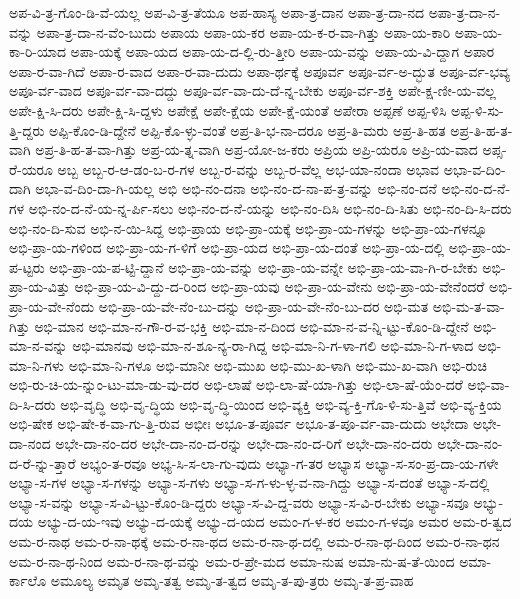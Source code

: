 {ಅಪ-ವಿ-ತ್ರ-ಗೊಂ-ಡಿ-ವೆ-ಯಲ್ಲ
ಅಪ-ವಿ-ತ್ರ-ತೆಯೂ
ಅಪ-ಹಾಸ್ಯ
ಅಪಾ-ತ್ರ-ದಾನ
ಅಪಾ-ತ್ರ-ದಾ-ನದ
ಅಪಾ-ತ್ರ-ದಾ-ನ-ವನ್ನು
ಅಪಾ-ತ್ರ-ದಾ-ನ-ವೆಂ-ಬುದು
ಅಪಾಯ
ಅಪಾ-ಯ-ಕರ
ಅಪಾ-ಯ-ಕ-ರ-ವಾ-ಗಿತ್ತು
ಅಪಾ-ಯ-ಕಾರಿ
ಅಪಾ-ಯ-ಕಾ-ರಿ-ಯಾದ
ಅಪಾ-ಯಕ್ಕೆ
ಅಪಾ-ಯದ
ಅಪಾ-ಯ-ದ-ಲ್ಲಿ-ರು-ತ್ತೀರಿ
ಅಪಾ-ಯ-ವನ್ನು
ಅಪಾ-ಯ-ವಿ-ದ್ದಾಗ
ಅಪಾರ
ಅಪಾ-ರ-ವಾ-ಗಿದೆ
ಅಪಾ-ರ-ವಾದ
ಅಪಾ-ರ-ವಾ-ದುದು
ಅಪಾ-ರ್ಥಕ್ಕೆ
ಅಪೂರ್ವ
ಅಪೂ-ರ್ವ-ಅ-ದ್ಭುತ
ಅಪೂ-ರ್ವ-ಭವ್ಯ
ಅಪೂ-ರ್ವ-ವಾದ
ಅಪೂ-ರ್ವ-ವಾ-ದದ್ದು
ಅಪೂ-ರ್ವ-ವಾ-ದು-ದೆ-ನ್ನ-ಬೇಕು
ಅಪೂ-ರ್ವ-ಶಕ್ತಿ
ಅಪೇ-ಕ್ಷ-ಣೀ-ಯ-ವಲ್ಲ
ಅಪೇ-ಕ್ಷಿ-ಸಿ-ದರು
ಅಪೇ-ಕ್ಷಿ-ಸಿ-ದ್ದಳು
ಅಪೇಕ್ಷೆ
ಅಪೇ-ಕ್ಷೆಯ
ಅಪೇ-ಕ್ಷೆ-ಯಂತೆ
ಅಪೇರಾ
ಅಪ್ಪಣೆ
ಅಪ್ಪ-ಳಿಸಿ
ಅಪ್ಪ-ಳಿ-ಸು-ತ್ತಿ-ದ್ದರು
ಅಪ್ಪಿ-ಕೊಂ-ಡಿ-ದ್ದೇನೆ
ಅಪ್ಪಿ-ಕೊ-ಳ್ಳು-ವಂತೆ
ಅಪ್ರ-ತಿ-ಭ-ನಾ-ದರೂ
ಅಪ್ರ-ತಿ-ಮರು
ಅಪ್ರ-ತಿ-ಹತ
ಅಪ್ರ-ತಿ-ಹ-ತ-ವಾಗಿ
ಅಪ್ರ-ತಿ-ಹ-ತ-ವಾ-ಗಿತ್ತು
ಅಪ್ರ-ಯ-ತ್ನ-ವಾಗಿ
ಅಪ್ರ-ಯೋ-ಜ-ಕರು
ಅಪ್ರಿಯ
ಅಪ್ರಿ-ಯರೂ
ಅಪ್ರಿ-ಯ-ವಾದ
ಅಪ್ಸ-ರೆ-ಯರೂ
ಅಬ್ಬ
ಅಬ್ಬ-ರ-ಆ-ಡಂ-ಬ-ರ-ಗಳ
ಅಬ್ಬ-ರ-ವನ್ನು
ಅಬ್ಬ-ರ-ವೆಲ್ಲ
ಅಭ-ಯಾ-ನಂದಾ
ಅಭಾವ
ಅಭಾ-ವ-ದಿಂ-ದಾಗಿ
ಅಭಾ-ವ-ದಿಂ-ದಾ-ಗಿ-ಯಲ್ಲ
ಅಭಿ
ಅಭಿ-ನಂ-ದನಾ
ಅಭಿ-ನಂ-ದ-ನಾ-ಪ-ತ್ರ-ವನ್ನು
ಅಭಿ-ನಂ-ದನೆ
ಅಭಿ-ನಂ-ದ-ನೆ-ಗಳ
ಅಭಿ-ನಂ-ದ-ನೆ-ಯ-ನ್ನ-ರ್ಪಿ-ಸಲು
ಅಭಿ-ನಂ-ದ-ನೆ-ಯನ್ನು
ಅಭಿ-ನಂ-ದಿಸಿ
ಅಭಿ-ನಂ-ದಿ-ಸಿತು
ಅಭಿ-ನಂ-ದಿ-ಸಿ-ದರು
ಅಭಿ-ನಂ-ದಿ-ಸುವ
ಅಭಿ-ನ-ಯಿ-ಸಿದ್ದ
ಅಭಿ-ಪ್ರಾಯ
ಅಭಿ-ಪ್ರಾ-ಯಕ್ಕೆ
ಅಭಿ-ಪ್ರಾ-ಯ-ಗಳನ್ನು
ಅಭಿ-ಪ್ರಾ-ಯ-ಗಳನ್ನೂ
ಅಭಿ-ಪ್ರಾ-ಯ-ಗಳಿಂದ
ಅಭಿ-ಪ್ರಾ-ಯ-ಗ-ಳಿಗೆ
ಅಭಿ-ಪ್ರಾ-ಯದ
ಅಭಿ-ಪ್ರಾ-ಯ-ದಂತೆ
ಅಭಿ-ಪ್ರಾ-ಯ-ದಲ್ಲಿ
ಅಭಿ-ಪ್ರಾ-ಯ-ಪ-ಟ್ಟರು
ಅಭಿ-ಪ್ರಾ-ಯ-ಪ-ಟ್ಟಿ-ದ್ದಾನೆ
ಅಭಿ-ಪ್ರಾ-ಯ-ವನ್ನು
ಅಭಿ-ಪ್ರಾ-ಯ-ವನ್ನೇ
ಅಭಿ-ಪ್ರಾ-ಯ-ವಾ-ಗಿ-ರ-ಬೇಕು
ಅಭಿ-ಪ್ರಾ-ಯ-ವಿತ್ತು
ಅಭಿ-ಪ್ರಾ-ಯ-ವಿ-ದ್ದು-ದ-ರಿಂದ
ಅಭಿ-ಪ್ರಾ-ಯವು
ಅಭಿ-ಪ್ರಾ-ಯ-ವೇನು
ಅಭಿ-ಪ್ರಾ-ಯ-ವೇನೆಂದರೆ
ಅಭಿ-ಪ್ರಾ-ಯ-ವೇ-ನೆಂದು
ಅಭಿ-ಪ್ರಾ-ಯ-ವೇ-ನೆಂ-ಬು-ದನ್ನು
ಅಭಿ-ಪ್ರಾ-ಯ-ವೇ-ನೆಂ-ಬು-ದರ
ಅಭಿ-ಮತ
ಅಭಿ-ಮ-ತ-ವಾ-ಗಿತ್ತು
ಅಭಿ-ಮಾನ
ಅಭಿ-ಮಾ-ನ-ಗೌ-ರ-ವ-ಭಕ್ತಿ
ಅಭಿ-ಮಾ-ನ-ದಿಂದ
ಅಭಿ-ಮಾ-ನ-ವ-ನ್ನಿ-ಟ್ಟು-ಕೊಂ-ಡಿ-ದ್ದೇನೆ
ಅಭಿ-ಮಾ-ನ-ವನ್ನು
ಅಭಿ-ಮಾನವು
ಅಭಿ-ಮಾ-ನ-ಶೂ-ನ್ಯ-ರಾ-ಗಿದ್ದ
ಅಭಿ-ಮಾ-ನಿ-ಗ-ಳಾ-ಗಲಿ
ಅಭಿ-ಮಾ-ನಿ-ಗ-ಳಾದ
ಅಭಿ-ಮಾ-ನಿ-ಗಳು
ಅಭಿ-ಮಾ-ನಿ-ಗಳೂ
ಅಭಿ-ಮಾನೀ
ಅಭಿ-ಮುಖ
ಅಭಿ-ಮು-ಖ-ಳಾಗಿ
ಅಭಿ-ಮು-ಖ-ವಾಗಿ
ಅಭಿ-ರುಚಿ
ಅಭಿ-ರು-ಚಿ-ಯ-ನ್ನುಂ-ಟು-ಮಾ-ಡು-ವು-ದರ
ಅಭಿ-ಲಾಷೆ
ಅಭಿ-ಲಾ-ಷೆ-ಯಾ-ಗಿತ್ತು
ಅಭಿ-ಲಾ-ಷೆ-ಯೆಂ-ದರೆ
ಅಭಿ-ವಾ-ದಿ-ಸಿ-ದರು
ಅಭಿ-ವೃದ್ಧಿ
ಅಭಿ-ವೃ-ದ್ಧಿಯ
ಅಭಿ-ವೃ-ದ್ಧಿ-ಯಿಂದ
ಅಭಿ-ವ್ಯಕ್ತಿ
ಅಭಿ-ವ್ಯ-ಕ್ತಿ-ಗೊ-ಳಿ-ಸು-ತ್ತಿವೆ
ಅಭಿ-ವ್ಯ-ಕ್ತಿಯ
ಅಭಿ-ಷೇಕ
ಅಭಿ-ಷೇ-ಕ-ವಾ-ಗು-ತ್ತಿ-ರುವ
ಅಭೀಃ
ಅಭೂ-ತ-ಪೂರ್ವ
ಅಭೂ-ತ-ಪೂ-ರ್ವ-ವಾ-ದುದು
ಅಭೇದಾ
ಅಭೇ-ದಾ-ನಂದ
ಅಭೇ-ದಾ-ನಂ-ದರ
ಅಭೇ-ದಾ-ನಂ-ದ-ರನ್ನು
ಅಭೇ-ದಾ-ನಂ-ದ-ರಿಗೆ
ಅಭೇ-ದಾ-ನಂ-ದರು
ಅಭೇ-ದಾ-ನಂ-ದ-ರೆ-ನ್ನು-ತ್ತಾರೆ
ಅಭ್ಯಂ-ತ-ರವೂ
ಅಭ್ಯ-ಸಿ-ಸ-ಲಾ-ಗು-ವುದು
ಅಭ್ಯಾ-ಗ-ತರ
ಅಭ್ಯಾಸ
ಅಭ್ಯಾ-ಸ-ಸಂ-ಪ್ರ-ದಾ-ಯ-ಗಳೇ
ಅಭ್ಯಾ-ಸ-ಗಳ
ಅಭ್ಯಾ-ಸ-ಗಳನ್ನು
ಅಭ್ಯಾ-ಸ-ಗಳು
ಅಭ್ಯಾ-ಸ-ಗ-ಳು-ಳ್ಳ-ವ-ನಾ-ಗಿದ್ದು
ಅಭ್ಯಾ-ಸ-ದಂತೆ
ಅಭ್ಯಾ-ಸ-ದಲ್ಲಿ
ಅಭ್ಯಾ-ಸ-ವನ್ನು
ಅಭ್ಯಾ-ಸ-ವಿ-ಟ್ಟು-ಕೊಂ-ಡಿ-ದ್ದರು
ಅಭ್ಯಾ-ಸ-ವಿ-ದ್ದ-ವರು
ಅಭ್ಯಾ-ಸ-ವಿ-ರ-ಬೇಕು
ಅಭ್ಯಾ-ಸವೂ
ಅಭ್ಯು-ದಯ
ಅಭ್ಯು-ದ-ಯ-ಇವು
ಅಭ್ಯು-ದ-ಯಕ್ಕೆ
ಅಭ್ಯು-ದ-ಯದ
ಅಮಂ-ಗ-ಳ-ಕರ
ಅಮಂ-ಗ-ಳವೂ
ಅಮರ
ಅಮ-ರ-ತ್ವದ
ಅಮ-ರ-ನಾಥ
ಅಮ-ರ-ನಾ-ಥಕ್ಕೆ
ಅಮ-ರ-ನಾ-ಥದ
ಅಮ-ರ-ನಾ-ಥ-ದಲ್ಲಿ
ಅಮ-ರ-ನಾ-ಥ-ದಿಂದ
ಅಮ-ರ-ನಾ-ಥನ
ಅಮ-ರ-ನಾ-ಥ-ನಿಂದ
ಅಮ-ರ-ನಾ-ಥ-ವನ್ನು
ಅಮ-ರ-ಪ್ರೇ-ಮದ
ಅಮಾ-ನುಷ
ಅಮಾ-ನು-ಷ-ತೆ-ಯಿಂದ
ಅಮಾ-ರ್ಕಾಲೊ
ಅಮೂಲ್ಯ
ಅಮೃತ
ಅಮೃ-ತತ್ವ
ಅಮೃ-ತ-ತ್ವದ
ಅಮೃ-ತ-ಪು-ತ್ರರು
ಅಮೃ-ತ-ಪ್ರ-ವಾಹ
}
